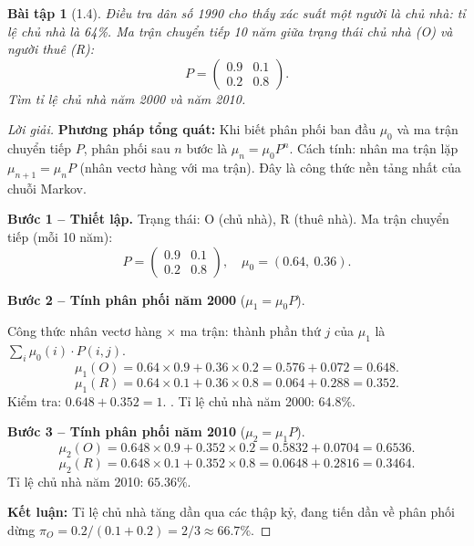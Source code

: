 \documentclass[8pt,a4paper]{article}
\newtheorem{exercise}{Bài tập}
\newenvironment{solution}{\begin{proof}[Lời giải]}{\end{proof}}
\begin{document}
\begin{exercise}[1.4]
Điều tra dân số 1990 cho thấy xác suất một người là chủ nhà: tỉ lệ chủ nhà là 64\%. Ma trận chuyển tiếp 10 năm giữa trạng thái chủ nhà (O) và người thuê (R):
\[
  P = \begin{pmatrix} 0.9 & 0.1 \\ 0.2 & 0.8 \end{pmatrix}.
\]
Tìm tỉ lệ chủ nhà năm 2000 và năm 2010.
\end{exercise}
\begin{solution}
\textbf{Phương pháp tổng quát:} Khi biết phân phối ban đầu $\mu_0$ và ma trận chuyển tiếp $P$, phân phối sau $n$ bước là $\mu_n = \mu_0 P^n$. Cách tính: nhân ma trận lặp $\mu_{n+1} = \mu_n P$ (nhân vectơ hàng với ma trận). Đây là công thức nền tảng nhất của chuỗi Markov.

\textbf{Bước 1 -- Thiết lập.}
Trạng thái: O (chủ nhà), R (thuê nhà). Ma trận chuyển tiếp (mỗi 10 năm):
\[
  P = \begin{pmatrix} 0.9 & 0.1 \\ 0.2 & 0.8 \end{pmatrix}, \quad \mu_0 = (0.64,\ 0.36).
\]

\textbf{Bước 2 -- Tính phân phối năm 2000} ($\mu_1 = \mu_0 P$).

Công thức nhân vectơ hàng $\times$ ma trận: thành phần thứ $j$ của $\mu_1$ là $\sum_i \mu_0(i) \cdot P(i,j)$.
\[
  \mu_1(O) = 0.64 \times 0.9 + 0.36 \times 0.2 = 0.576 + 0.072 = 0.648.
\]
\[
  \mu_1(R) = 0.64 \times 0.1 + 0.36 \times 0.8 = 0.064 + 0.288 = 0.352.
\]
Kiểm tra: $0.648 + 0.352 = 1$. \checkmark. Tỉ lệ chủ nhà năm 2000: $\mathbf{64.8\%}$.

\textbf{Bước 3 -- Tính phân phối năm 2010} ($\mu_2 = \mu_1 P$).
\[
  \mu_2(O) = 0.648 \times 0.9 + 0.352 \times 0.2 = 0.5832 + 0.0704 = 0.6536.
\]
\[
  \mu_2(R) = 0.648 \times 0.1 + 0.352 \times 0.8 = 0.0648 + 0.2816 = 0.3464.
\]
Tỉ lệ chủ nhà năm 2010: $\mathbf{65.36\%}$.

\textbf{Kết luận:} Tỉ lệ chủ nhà tăng dần qua các thập kỷ, đang tiến dần về phân phối dừng $\pi_O = 0.2/(0.1+0.2) = 2/3 \approx 66.7\%$.
\end{solution}
\end{document}
